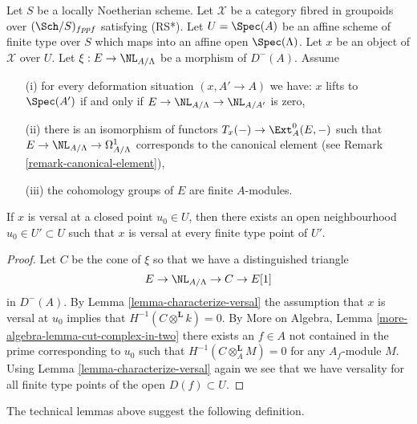 \begin{lemma}
\label{lemma-openness}
Let $S$ be a locally Noetherian scheme. Let $\mathcal{X}$ be a category
fibred in groupoids over $(\Sch/S)_{fppf}$ satisfying (RS*).
Let $U = \Spec(A)$ be an affine scheme of finite type over $S$ which maps
into an affine open $\Spec(\Lambda)$. Let $x$ be an object of $\mathcal{X}$
over $U$. Let $\xi : E \to \NL_{A/\Lambda}$ be a morphism of $D^{-}(A)$.
Assume
\begin{enumerate}
\item[(i)] for every deformation situation $(x, A' \to A)$ we have:
$x$ lifts to $\Spec(A')$ if and only if
$E \to \NL_{A/\Lambda} \to \NL_{A/A'}$ is zero,
\item[(ii)] there is an isomorphism of functors
$T_x(-) \to \Ext^0_A(E, -)$
such that $E \to \NL_{A/\Lambda} \to \Omega^1_{A/\Lambda}$
corresponds to the canonical element (see
Remark \ref{remark-canonical-element}),
\item[(iii)] the cohomology groups of $E$ are finite $A$-modules.
\end{enumerate}
If $x$ is versal at a closed point $u_0 \in U$,
then there exists an open neighbourhood $u_0 \in U' \subset U$
such that $x$ is versal at every finite type point of $U'$.
\end{lemma}

\begin{proof}
Let $C$ be the cone of $\xi$ so that we have a distinguished triangle
$$
E \to \NL_{A/\Lambda} \to C \to E[1]
$$
in $D^{-}(A)$. By Lemma \ref{lemma-characterize-versal}
the assumption that $x$ is versal at $u_0$ implies that
$H^{-1}(C \otimes^\mathbf{L} k) = 0$. By
More on Algebra, Lemma \ref{more-algebra-lemma-cut-complex-in-two}
there exists an $f \in A$ not contained in the prime corresponding to
$u_0$ such that $H^{-1}(C \otimes^\mathbf{L}_A M) = 0$ for
any $A_f$-module $M$. Using
Lemma \ref{lemma-characterize-versal}
again we see that we have versality for all finite type points of
the open $D(f) \subset U$.
\end{proof}

\noindent
The technical lemmas above suggest the following definition.

